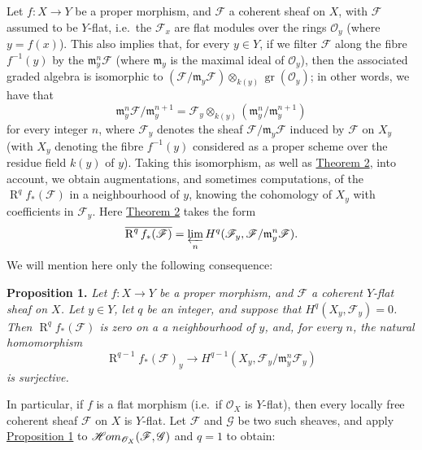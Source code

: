 \documentclass{article}
\newenvironment{itenv}[1]
  {\phantomsection\par\smallskip\noindent\textbf{#1.}\itshape}
  {\par\smallskip}
\newcommand{\oldpage}[1]{\marginpar{\footnotesize$\Big\vert$ \textit{p.~#1}}}
\theoremstyle{definition}
\theoremstyle{definition}
\theoremstyle{definition}
\theoremstyle{definition}
\theoremstyle{remark}
\begin{document}
Let \(f\colon X\to Y\) be a proper morphism, and \({\mathscr{F}}\) a coherent sheaf on \(X\), with \({\mathscr{F}}\) assumed to be \(Y\)-flat, i.e.~the \({\mathscr{F}}_x\) are flat modules over the rings \({\mathscr{O}}_y\) (where \(y=f(x)\)).
\oldpage{182-09}This also implies that, for every \(y\in Y\), if we filter \({\mathscr{F}}\) along the fibre \(f^{-1}(y)\) by the \({\mathfrak{m}}_y^n{\mathscr{F}}\) (where \({\mathfrak{m}}_y\) is the maximal ideal of \({\mathscr{O}}_y\)), then the associated graded algebra is isomorphic to \(({\mathscr{F}}/{\mathfrak{m}}_y{\mathscr{F}})\otimes_{k(y)}\operatorname{gr}({\mathscr{O}}_y)\);
in other words, we have that
\[
  {\mathfrak{m}}_y^n{\mathscr{F}}/{\mathfrak{m}}_y^{n+1}
  = {\mathscr{F}}_y\otimes_{k(y)}({\mathfrak{m}}_y^n/{\mathfrak{m}}_y^{n+1})
\]
for every integer \(n\), where \({\mathscr{F}}_y\) denotes the sheaf \({\mathscr{F}}/{\mathfrak{m}}_y{\mathscr{F}}\) induced by \({\mathscr{F}}\) on \(X_y\) (with \(X_y\) denoting the fibre \(f^{-1}(y)\) considered as a proper scheme over the residue field \(k(y)\) of \(y\)).
Taking this isomorphism, as well as \protect\hyperlink{fga-2-theorem-2}{Theorem 2}, into account, we obtain augmentations, and sometimes computations, of the \(\operatorname{R}^q f_*({\mathscr{F}})\) in a neighbourhood of \(y\), knowing the cohomology of \(X_y\) with coefficients in \({\mathscr{F}}_y\).
Here \protect\hyperlink{fga-2-theorem-2}{Theorem 2} takes the form
\[
  \overline{\operatorname{R}^q f_*({\mathscr{F}})} = \varprojlim_n H^q({\mathscr{F}}_y,{\mathscr{F}}/{\mathfrak{m}}_y^n{\mathscr{F}}).
\]
We will mention here only the following consequence:

\leavevmode{}%
\begin{itenv}{Proposition 1}
Let \(f\colon X\to Y\) be a proper morphism, and \({\mathscr{F}}\) a coherent \(Y\)-flat sheaf on \(X\).
Let \(y\in Y\), let \(q\) be an integer, and suppose that \(H^q(X_y,{\mathscr{F}}_y)=0\).
Then \(\operatorname{R}^q f_*({\mathscr{F}})\) is zero on a a neighbourhood of \(y\), and, for every \(n\), the natural homomorphism
\[
  \operatorname{R}^{q-1}f_*({\mathscr{F}})_y \to H^{q-1}(X_y,{\mathscr{F}}_y/{\mathfrak{m}}_y^n{\mathscr{F}}_y)
\]
is surjective.

\end{itenv}

In particular, if \(f\) is a flat morphism (i.e.~if \({\mathscr{O}}_X\) is \(Y\)-flat), then every locally free coherent sheaf \({\mathscr{F}}\) on \(X\) is \(Y\)-flat.
Let \({\mathscr{F}}\) and \({\mathscr{G}}\) be two such sheaves, and apply \protect\hyperlink{fga-2-proposition-1}{Proposition 1} to \(\mathscr{H}\kern -.5pt om_{{\mathscr{O}}_X}({\mathscr{F}},{\mathscr{G}})\) and \(q=1\) to obtain:
\end{document}
